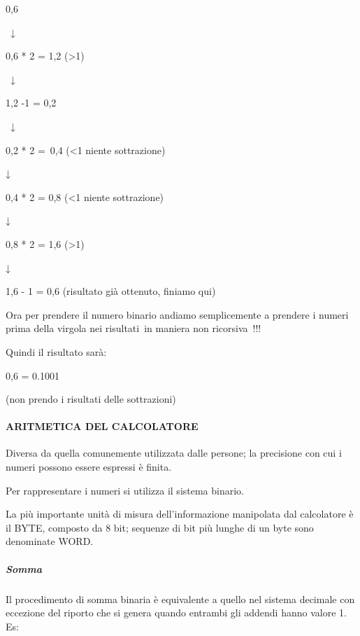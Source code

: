\documentclass[
]{article}
\begin{document}
{}

{}

{0,6 ~}

{~↓}

{0,6 * 2 = }{1}{,2 (\textgreater1) }

{~↓}

{1,2 -1 = 0,2 }

{~↓}

{0,2 * 2 =}{~0}{,4 (\textless1 niente sottrazione)}

{↓}

{0,4 * 2 = }{0}{,8 (\textless1 niente sottrazione)}

{↓}

{0,8 * 2 = }{1}{,6 (\textgreater1) }

{↓}

{1,6 - 1 = 0,6 (risultato già ottenuto, finiamo qui)}

{}

{Ora per prendere il numero binario andiamo semplicemente a prendere i
}{numeri prima della virgola nei risultati}{~in maniera non
ricorsiva}{~!!!}

{Quindi il risultato sarà:}

{0,6 = 0.1001}

{}

{(non prendo i risultati delle sottrazioni)}

{}

\paragraph{\texorpdfstring{{ARITMETICA DEL
CALCOLATORE}}{ARITMETICA DEL CALCOLATORE}}\label{h.6s7xvf4zsa2v}

{Diversa da quella comunemente utilizzata dalle persone; la precisione
con cui i numeri possono essere espressi è finita.}

{Per rappresentare i numeri si utilizza il sistema binario.}

{La più importante unità di misura dell'informazione manipolata dal
calcolatore è il BYTE, composto da 8 bit; sequenze di bit più lunghe di
un byte sono denominate WORD}{.}

{}

\subparagraph{\texorpdfstring{{Somma}}{Somma}}\label{h.nsq1h9ofd1y0}

{Il procedimento di somma binaria è equivalente a quello nel sistema
decimale con eccezione del riporto che si genera quando entrambi gli
addendi hanno valore 1. Es:}

{}
\end{document}
